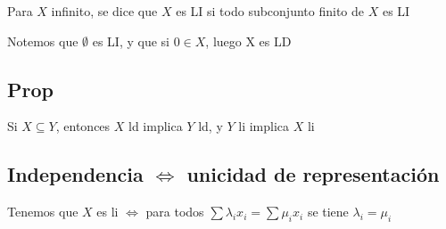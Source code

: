 \documentclass{article}
\begin{document}
Para $X$ infinito, se dice que $X$ es LI si todo subconjunto finito de $X$ es LI

Notemos que $\emptyset$ es LI, y que si $0 \in X$, luego X es LD

\subsection{Prop}
Si $X \subseteq Y$, entonces $X$ ld implica $Y$ ld, y $Y$ li implica $X$ li

\subsection{Independencia $\iff$ unicidad de representación}
Tenemos que $X$ es li $\iff$ para todos
$\sum \lambda_ix_i = \sum \mu_ix_i$ se tiene $\lambda_i = \mu_i$
\end{document}
